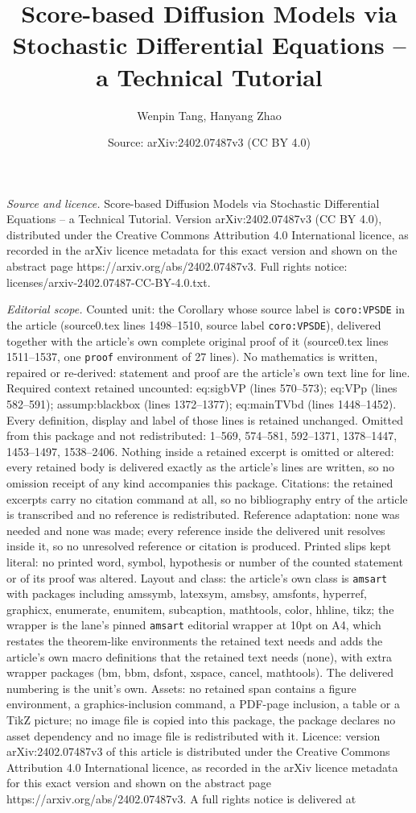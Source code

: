 \documentclass[10pt,a4paper]{amsart}
\title[Score-based Diffusion Models via Stochastic Differential Equ]{Score-based Diffusion Models via Stochastic Differential Equations -- a Technical Tutorial}
\author{Wenpin Tang, Hanyang Zhao}
\date{Source: arXiv:2402.07487v3 (CC BY 4.0)}
\begin{document}
\maketitle

\noindent\emph{Source and licence.} Score-based Diffusion Models via Stochastic Differential Equations -- a Technical Tutorial. Version arXiv:2402.07487v3 (CC BY 4.0), distributed under the Creative Commons Attribution 4.0 International licence, as recorded in the arXiv licence metadata for this exact version and shown on the abstract page https://arxiv.org/abs/2402.07487v3. Full rights notice: licenses/arxiv-2402.07487-CC-BY-4.0.txt.\par\smallskip

\noindent\textit{Editorial scope.} Counted unit: the Corollary whose source label is \texttt{coro:VPSDE} in the article (source0.tex lines 1498--1510, source label \texttt{coro:VPSDE}), delivered together with the article's own complete original proof of it (source0.tex lines 1511--1537, one \texttt{proof} environment of 27 lines). No mathematics is written, repaired or re-derived: statement and proof are the article's own text line for line. Required context retained uncounted: eq:sigbVP (lines 570--573); eq:VPp (lines 582--591); assump:blackbox (lines 1372--1377); eq:mainTVbd (lines 1448--1452). Every definition, display and label of those lines is retained unchanged. Omitted from this package and not redistributed: 1--569, 574--581, 592--1371, 1378--1447, 1453--1497, 1538--2406. Nothing inside a retained excerpt is omitted or altered: every retained body is delivered exactly as the article's lines are written, so no omission receipt of any kind accompanies this package. Citations: the retained excerpts carry no citation command at all, so no bibliography entry of the article is transcribed and no reference is redistributed. Reference adaptation: none was needed and none was made; every reference inside the delivered unit resolves inside it, so no unresolved reference or citation is produced. Printed slips kept literal: no printed word, symbol, hypothesis or number of the counted statement or of its proof was altered. Layout and class: the article's own class is \texttt{amsart} with packages including amssymb, latexsym, amsbsy, amsfonts, hyperref, graphicx, enumerate, enumitem, subcaption, mathtools, color, hhline, tikz; the wrapper is the lane's pinned \texttt{amsart} editorial wrapper at 10pt on A4, which restates the theorem-like environments the retained text needs and adds the article's own macro definitions that the retained text needs (none), with extra wrapper packages (bm, bbm, dsfont, xspace, cancel, mathtools). The delivered numbering is the unit's own. Assets: no retained span contains a figure environment, a graphics-inclusion command, a PDF-page inclusion, a table or a TikZ picture; no image file is copied into this package, the package declares no asset dependency and no image file is redistributed with it. Licence: version arXiv:2402.07487v3 of this article is distributed under the Creative Commons Attribution 4.0 International licence, as recorded in the arXiv licence metadata for this exact version and shown on the abstract page https://arxiv.org/abs/2402.07487v3. A full rights notice is delivered at 
\end{document}
